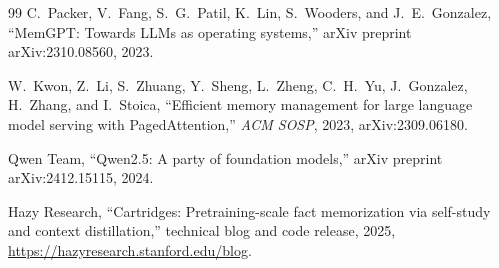 \documentclass[conference]{IEEEtran}
\begin{document}
\begin{thebibliography}{99}
C.~Packer, V.~Fang, S.~G.~Patil, K.~Lin, S.~Wooders, and J.~E.~Gonzalez,
``MemGPT: Towards LLMs as operating systems,''
arXiv preprint arXiv:2310.08560, 2023.

W.~Kwon, Z.~Li, S.~Zhuang, Y.~Sheng, L.~Zheng, C.~H.~Yu, J.~Gonzalez, H.~Zhang, and I.~Stoica,
``Efficient memory management for large language model serving with PagedAttention,''
\emph{ACM SOSP}, 2023, arXiv:2309.06180.

Qwen Team,
``Qwen2.5: A party of foundation models,''
arXiv preprint arXiv:2412.15115, 2024.

Hazy Research,
``Cartridges: Pretraining-scale fact memorization via self-study and context distillation,''
technical blog and code release, 2025, \url{https://hazyresearch.stanford.edu/blog}.

\end{thebibliography}
\end{document}
